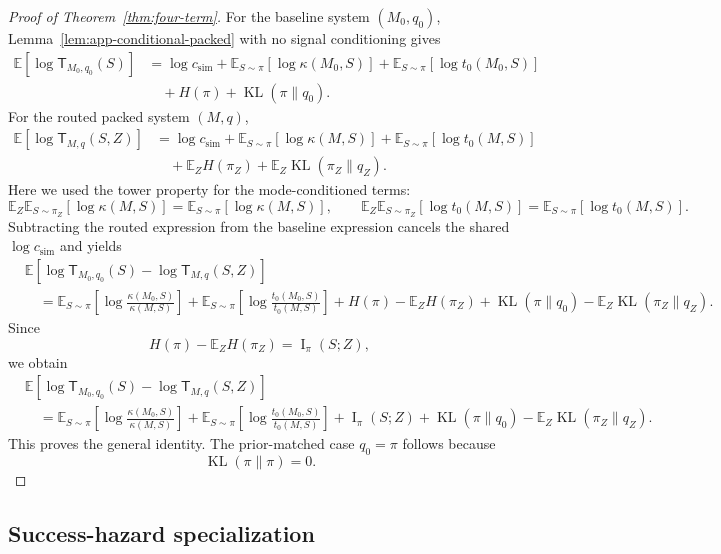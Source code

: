 \documentclass{article}
\DeclareMathOperator{\KL}{KL}
\DeclareMathOperator{\MI}{I}
\newcommand{\E}{\mathbb{E}}
\begin{document}
\begin{proof}[Proof of Theorem~\ref{thm:four-term}]
For the baseline system \((M_0,q_0)\), Lemma~\ref{lem:app-conditional-packed} with no
signal conditioning gives
\[
\begin{aligned}
    \E[\log \mathsf T_{M_0,q_0}(S)]
    &=
    \log c_{\mathrm{sim}}
    +
    \E_{S\sim\pi}[\log\kappa(M_0,S)]
    +
    \E_{S\sim\pi}[\log t_0(M_0,S)]
    \\
    &\quad
    +
    H(\pi)
    +
    \KL(\pi\|q_0).
\end{aligned}
\]
For the routed packed system \((M,q)\),
\[
\begin{aligned}
    \E[\log \mathsf T_{M,q}(S,Z)]
    &=
    \log c_{\mathrm{sim}}
    +
    \E_{S\sim\pi}[\log\kappa(M,S)]
    +
    \E_{S\sim\pi}[\log t_0(M,S)]
    \\
    &\quad
    +
    \E_ZH(\pi_Z)
    +
    \E_Z\KL(\pi_Z\|q_Z).
\end{aligned}
\]
Here we used the tower property for the mode-conditioned terms:
\[
    \E_Z\E_{S\sim\pi_Z}[\log\kappa(M,S)]
    =
    \E_{S\sim\pi}[\log\kappa(M,S)],
    \qquad
    \E_Z\E_{S\sim\pi_Z}[\log t_0(M,S)]
    =
    \E_{S\sim\pi}[\log t_0(M,S)].
\]
Subtracting the routed expression from the baseline expression cancels the shared
\(\log c_{\mathrm{sim}}\) and yields
\[
\begin{aligned}
&\E[
    \log \mathsf T_{M_0,q_0}(S)
    -
    \log \mathsf T_{M,q}(S,Z)
]
\\
&\quad =
\E_{S\sim\pi}
\left[
    \log\frac{\kappa(M_0,S)}{\kappa(M,S)}
\right]
+
\E_{S\sim\pi}
\left[
    \log\frac{t_0(M_0,S)}{t_0(M,S)}
\right]
+
H(\pi)-\E_ZH(\pi_Z)
+
\KL(\pi\|q_0)
-
\E_Z\KL(\pi_Z\|q_Z).
\end{aligned}
\]
Since
\[
    H(\pi)-\E_ZH(\pi_Z)=\MI_\pi(S;Z),
\]
we obtain
\[
\begin{aligned}
&\E[
    \log \mathsf T_{M_0,q_0}(S)
    -
    \log \mathsf T_{M,q}(S,Z)
]
\\
&\quad =
\E_{S\sim\pi}
\left[
    \log\frac{\kappa(M_0,S)}{\kappa(M,S)}
\right]
+
\E_{S\sim\pi}
\left[
    \log\frac{t_0(M_0,S)}{t_0(M,S)}
\right]
+
\MI_\pi(S;Z)
+
\KL(\pi\|q_0)
-
\E_Z\KL(\pi_Z\|q_Z).
\end{aligned}
\]
This proves the general identity.  The prior-matched case \(q_0=\pi\) follows because
\[
    \KL(\pi\|\pi)=0.
\]
\end{proof}

\subsection{Success-hazard specialization}
\end{document}
